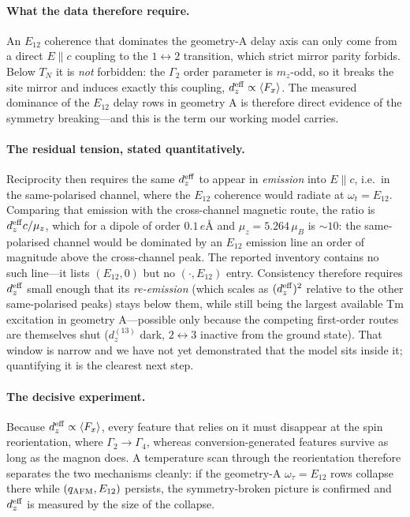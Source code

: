 \documentclass[11pt]{article}
\newcommand{\qafm}{q_{\rm AFM}}
\begin{document}
\paragraph{What the data therefore require.}
An $E_{12}$ coherence that dominates the geometry-A delay axis can only
come from a direct $E\!\parallel\!c$ coupling to the
$1\!\leftrightarrow\!2$ transition, which strict mirror parity forbids.
Below $T_N$ it is \emph{not} forbidden: the $\Gamma_2$ order parameter
is $m_z$-odd, so it breaks the site mirror and induces exactly this
coupling, $d_z^{\rm eff}\propto\langle F_x\rangle$.  The measured
dominance of the $E_{12}$ delay rows in geometry A is therefore direct
evidence of the symmetry breaking---and this is the term our working
model carries.

\paragraph{The residual tension, stated quantitatively.}
Reciprocity then requires the same $d_z^{\rm eff}$ to appear in
\emph{emission} into $E\!\parallel\!c$, i.e.\ in the same-polarised
channel, where the $E_{12}$ coherence would radiate at
$\omega_t=E_{12}$.  Comparing that emission with the cross-channel
magnetic route, the ratio is
$d_z^{\rm eff}c/\mu_z$, which for a dipole of order $0.1\,e$\AA{} and
$\mu_z=5.264\,\mu_B$ is $\sim\!10$: the same-polarised channel would be
dominated by an $E_{12}$ emission line an order of magnitude above the
cross-channel peak.  The reported inventory contains no such line---it
lists $(E_{12},0)$ but no $(\cdot,E_{12})$ entry.  Consistency
therefore requires $d_z^{\rm eff}$ small enough that its
\emph{re-emission} (which scales as $(d_z^{\rm eff})^2$ relative to the
other same-polarised peaks) stays below them, while still being the
largest available Tm excitation in geometry A---possible only because
the competing first-order routes are themselves shut ($d_z^{(13)}$
dark, $2\!\leftrightarrow\!3$ inactive from the ground state).  That
window is narrow and we have not yet demonstrated that the model sits
inside it; quantifying it is the clearest next step.

\paragraph{The decisive experiment.}
Because $d_z^{\rm eff}\propto\langle F_x\rangle$, every feature that
relies on it must disappear at the spin reorientation, where
$\Gamma_2\to\Gamma_4$, whereas conversion-generated features survive as
long as the magnon does.  A temperature scan through the reorientation
therefore separates the two mechanisms cleanly: if the geometry-A
$\omega_\tau=E_{12}$ rows collapse there while $(\qafm,E_{12})$
persists, the symmetry-broken picture is confirmed and $d_z^{\rm eff}$
is measured by the size of the collapse.
\end{document}
